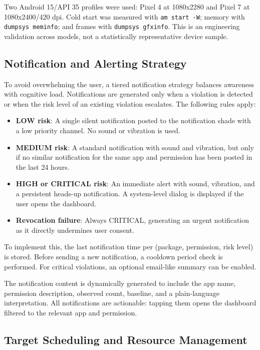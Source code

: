 Two Android 15/API 35 profiles were used: Pixel 4 at 1080x2280 and Pixel 7 at 1080x2400/420 dpi. Cold start was measured with \texttt{am start -W}; memory with \texttt{dumpsys meminfo}; and frames with \texttt{dumpsys gfxinfo}. This is an engineering validation across models, not a statistically representative device sample.

\subsection{Notification and Alerting Strategy}

To avoid overwhelming the user, a tiered notification strategy balances awareness with cognitive load. Notifications are generated only when a violation is detected or when the risk level of an existing violation escalates. The following rules apply:

\begin{itemize}
\item \textbf{LOW risk}: A single silent notification posted to the notification shade with a low priority channel. No sound or vibration is used.
\item \textbf{MEDIUM risk}: A standard notification with sound and vibration, but only if no similar notification for the same app and permission has been posted in the last 24 hours.
\item \textbf{HIGH or CRITICAL risk}: An immediate alert with sound, vibration, and a persistent heads-up notification. A system-level dialog is displayed if the user opens the dashboard.
\item \textbf{Revocation failure}: Always CRITICAL, generating an urgent notification as it directly undermines user consent.
\end{itemize}

To implement this, the last notification time per (package, permission, risk level) is stored. Before sending a new notification, a cooldown period check is performed. For critical violations, an optional email-like summary can be enabled.

The notification content is dynamically generated to include the app name, permission description, observed count, baseline, and a plain-language interpretation. All notifications are actionable: tapping them opens the dashboard filtered to the relevant app and permission.

\subsection{Target Scheduling and Resource Management}

